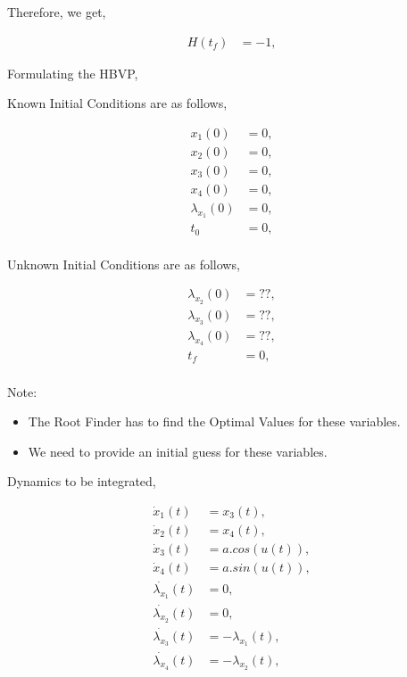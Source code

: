 \documentclass[11pt,usenames]{article}
\begin{document}
	Therefore, we get,
	
	\begin{align}
	H(t_{f}) &= -1, 
	\end{align}
	
	
	\newpage
	
	
	Formulating the HBVP,
	
	
	
	Known Initial Conditions are as follows,
	
	\begin{align}
	x_{1}(0) &= 0 , \nonumber \\
	x_{2}(0) &= 0 , \nonumber \\
	x_{3}(0) &= 0 ,  \\
	x_{4}(0) &= 0 , \nonumber \\
	\lambda_{x_{1}}(0) &= 0 , \nonumber \\
	t_{0} &= 0 , \nonumber \\
	\end{align}
	
	
	
	Unknown Initial Conditions are as follows,
	
	\begin{align}
	\lambda_{x_{2}}(0) &= \text{??} , \nonumber \\
	\lambda_{x_{3}}(0) &= \text{??} ,  \\
	\lambda_{x_{4}}(0) &= \text{??} , \nonumber \\
	t_{f} &= 0 , \nonumber \\
	\end{align}
	
	Note:
	\begin{itemize}
		\item The Root Finder has to find the Optimal Values for these variables.
		\item We need to provide an initial guess for these variables.
	\end{itemize}
	
	Dynamics to be integrated,
	
	\begin{align}
	\dot x_{1}(t) &= x_{3}(t), \nonumber \\
	\dot x_{2}(t) &= x_{4}(t), \nonumber \\
	\dot x_{3}(t) &= a.cos(u(t)),\nonumber\\
	\dot x_{4}(t) &= a.sin(u(t)),  \\
	\dot{\lambda_{x_{1}}}(t) &= 0, \nonumber \\
	\dot{\lambda_{x_{2}}}(t) &= 0, \nonumber \\
	\dot{\lambda_{x_{3}}}(t) &= - \lambda_{x_{1}}(t),\nonumber\\
	\dot{\lambda_{x_{4}}}(t) &= - \lambda_{x_{2}}(t), \nonumber
	\end{align}
	
\end{document}
